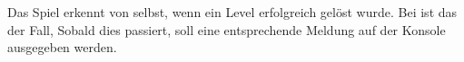 Das Spiel erkennt von selbst, wenn ein Level erfolgreich gel\"ost wurde.
Bei \gameTitle{} ist das der Fall, 
Sobald dies passiert, soll eine entsprechende Meldung auf der
Konsole ausgegeben werden. 

